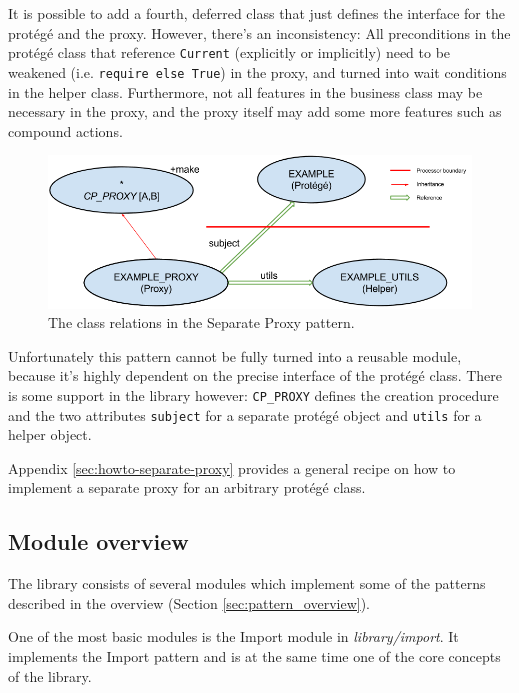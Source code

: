 \documentclass[a4paper,10pt]{article}
\newcommand{\dir}{\emph}
\begin{document}
It is possible to add a fourth, deferred class that just defines the interface for the protégé and the proxy.
However, there's an inconsistency: 
All preconditions in the protégé class that reference \lstinline!Current! (explicitly or implicitly) need to be weakened (i.e. \lstinline!require else True!) in the proxy, and turned into wait conditions in the helper class.
Furthermore, not all features in the business class may be necessary in the proxy, and the proxy itself may add some more features such as compound actions.

\begin{figure}[h]
\label{fig:separate-proxy}
\includegraphics[width=\textwidth]{separate_proxy.png}
\caption{The class relations in the Separate Proxy pattern.}
\end{figure}

Unfortunately this pattern cannot be fully turned into a reusable module, because it's highly dependent on the precise interface of the protégé class.
There is some support in the library however: 
\lstinline!CP_PROXY! defines the creation procedure and the two attributes \lstinline!subject! for a separate protégé object and \lstinline!utils! for a helper object.

Appendix \ref{sec:howto-separate-proxy} provides a general recipe on how to implement a separate proxy for an arbitrary protégé class.

\subsection {Module overview}
\label{sec:module-overview}

The library consists of several modules which implement some of the patterns described in the overview (Section \ref{sec:pattern_overview}).

One of the most basic modules is the Import module in \dir{library/import}.
It implements the Import  pattern  and is at the same time one of the core concepts of the library.
\end{document}
